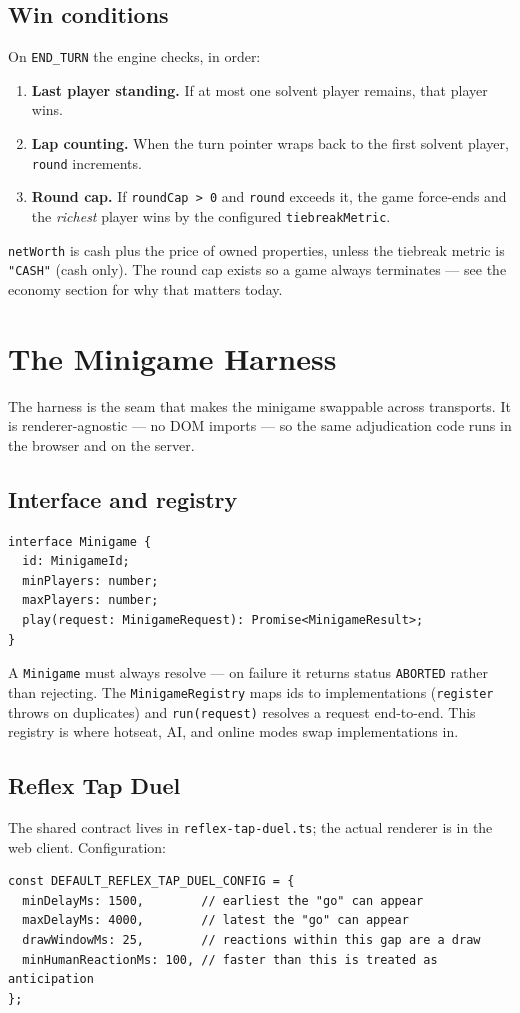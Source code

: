 \documentclass[11pt,a4paper]{article}
\newcommand{\code}[1]{\texttt{#1}}
\begin{document}
\subsection{Win conditions}
On \code{END\_TURN} the engine checks, in order:
\begin{enumerate}[leftmargin=1.6em,nosep]
  \item \textbf{Last player standing.} If at most one solvent player remains,
        that player wins.
  \item \textbf{Lap counting.} When the turn pointer wraps back to the first
        solvent player, \code{round} increments.
  \item \textbf{Round cap.} If \code{roundCap > 0} and \code{round} exceeds it,
        the game force-ends and the \emph{richest} player wins by the
        configured \code{tiebreakMetric}.
\end{enumerate}
\code{netWorth} is cash plus the price of owned properties, unless the tiebreak
metric is \code{"CASH"} (cash only). The round cap exists so a game always
terminates --- see the economy section for why that matters today.

\section{The Minigame Harness}

The harness is the seam that makes the minigame swappable across transports. It
is renderer-agnostic --- no DOM imports --- so the same adjudication code runs
in the browser and on the server.

\subsection{Interface and registry}
\begin{lstlisting}
interface Minigame {
  id: MinigameId;
  minPlayers: number;
  maxPlayers: number;
  play(request: MinigameRequest): Promise<MinigameResult>;
}
\end{lstlisting}
A \code{Minigame} must always resolve --- on failure it returns status
\code{ABORTED} rather than rejecting. The \code{MinigameRegistry} maps ids to
implementations (\code{register} throws on duplicates) and \code{run(request)}
resolves a request end-to-end. This registry is where hotseat, AI, and online
modes swap implementations in.

\subsection{Reflex Tap Duel}
The shared contract lives in \code{reflex-tap-duel.ts}; the actual renderer is
in the web client. Configuration:
\begin{lstlisting}
const DEFAULT_REFLEX_TAP_DUEL_CONFIG = {
  minDelayMs: 1500,        // earliest the "go" can appear
  maxDelayMs: 4000,        // latest the "go" can appear
  drawWindowMs: 25,        // reactions within this gap are a draw
  minHumanReactionMs: 100, // faster than this is treated as anticipation
};
\end{lstlisting}
\end{document}
